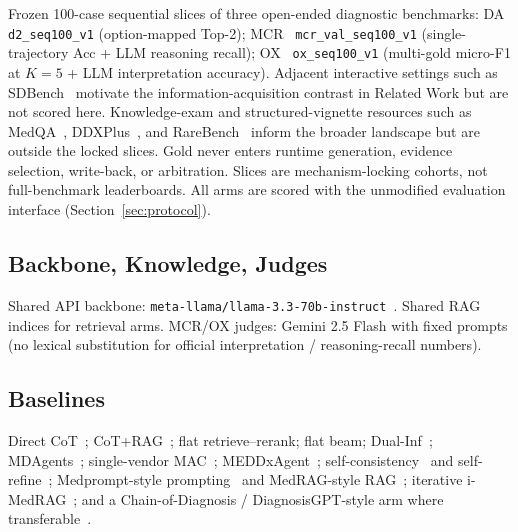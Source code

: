 Frozen 100-case sequential slices of three open-ended diagnostic benchmarks:
DA~\cite{diagnosisarena} \texttt{d2\_seq100\_v1} (option-mapped Top-2);
MCR~\cite{medcasereasoning} \texttt{mcr\_val\_seq100\_v1} (single-trajectory Acc + LLM reasoning recall);
OX~\cite{dualinf2025} \texttt{ox\_seq100\_v1} (multi-gold micro-F1 at $K{=}5$ + LLM interpretation accuracy).
Adjacent interactive settings such as SDBench~\cite{sdbench2025} motivate the information-acquisition contrast in Related Work but are not scored here.
Knowledge-exam and structured-vignette resources such as MedQA~\cite{jin2021medqa}, DDXPlus~\cite{fansi2022ddxplus}, and RareBench~\cite{rarebench} inform the broader landscape but are outside the locked slices.
Gold never enters runtime generation, evidence selection, write-back, or arbitration.
Slices are mechanism-locking cohorts, not full-benchmark leaderboards.
All arms are scored with the unmodified evaluation interface (Section~\ref{sec:protocol}).

\subsection{Backbone, Knowledge, Judges}
\label{sec:backbone}

Shared API backbone: \texttt{meta-llama/llama-3.3-70b-instruct}~\cite{llama33}.
Shared RAG indices for retrieval arms.
MCR/OX judges: Gemini 2.5 Flash with fixed prompts (no lexical substitution for official interpretation / reasoning-recall numbers).

\subsection{Baselines}
\label{sec:baselines}

Direct CoT~\cite{wei2022cot}; CoT+RAG~\cite{lewis2020rag,xiong2024medrag}; flat retrieve--rerank; flat beam; Dual-Inf~\cite{dualinf2025}; MDAgents~\cite{mdagents}; single-vendor MAC~\cite{chen2025mac,mac2026}; MEDDxAgent~\cite{meddxagent2025}; self-consistency~\cite{wang2023selfconsistency} and self-refine~\cite{madaan2023selfrefine}; Medprompt-style prompting~\cite{medprompt} and MedRAG-style RAG~\cite{medrag}; iterative i-MedRAG~\cite{imedrag}; and a Chain-of-Diagnosis / DiagnosisGPT-style arm where transferable~\cite{chainofdiagnosis}.

